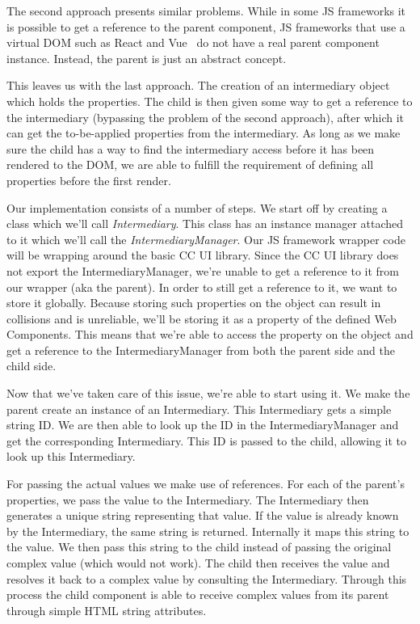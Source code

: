 {	The second approach presents similar problems. While in some JS frameworks it is possible to get a reference to the parent component, JS frameworks that use a virtual DOM such as React and Vue~ do not have a real parent component instance. Instead, the parent is just an abstract concept.

	This leaves us with the last approach. The creation of an intermediary object which holds the properties. The child is then given some way to get a reference to the intermediary (bypassing the problem of the second approach), after which it can get the to-be-applied properties from the intermediary. As long as we make sure the child has a way to find the intermediary access before it has been rendered to the DOM, we are able to fulfill the requirement of defining all properties before the first render.
}{
	Our implementation consists of a number of steps. We start off by creating a class which we'll call \emph{Intermediary}. This class has an instance manager attached to it which we'll call the \emph{IntermediaryManager}. Our JS framework wrapper code will be wrapping around the basic CC UI library. Since the CC UI library does not export the IntermediaryManager, we're unable to get a reference to it from our wrapper (aka the parent). In order to still get a reference to it, we want to store it globally. Because storing such properties on the  object can result in collisions and is unreliable, we'll be storing it as a property of the defined Web Components. This means that we're able to access the  property on the   object and get a reference to the IntermediaryManager from both the parent side and the child side.

	Now that we've taken care of this issue, we're able to start using it. We make the parent create an instance of an Intermediary. This Intermediary gets a simple string ID\@. We are then able to look up the ID in the IntermediaryManager and get the corresponding Intermediary. This ID is passed to the child, allowing it to look up this Intermediary.

	For passing the actual values we make use of references. For each of the parent's properties, we pass the value to the Intermediary. The Intermediary then generates a unique string representing that value. If the value is already known by the Intermediary, the same string is returned. Internally it maps this string to the value. We then pass this string to the child instead of passing the original complex value (which would not work). The child then receives the value and resolves it back to a complex value by consulting the Intermediary. Through this process the child component is able to receive complex values from its parent through simple HTML string attributes.
}

